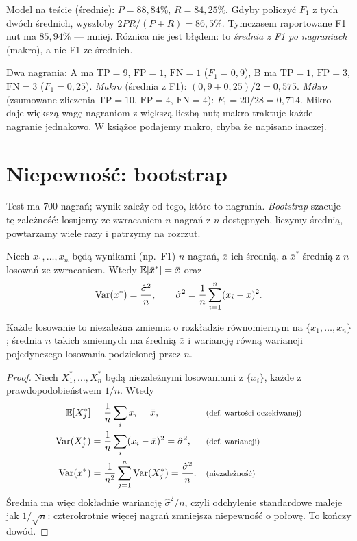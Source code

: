 \begin{naliczbach}
Model na teście (średnie): $P=88{,}84\%$, $R=84{,}25\%$. Gdyby policzyć $F_1$ z tych dwóch średnich, wyszłoby $2PR/(P+R)=86{,}5\%$. Tymczasem raportowane F1 nut ma $85{,}94\%$ --- mniej. Różnica nie jest błędem: to \emph{średnia z F1 po nagraniach} (makro), a nie F1 ze średnich.
\end{naliczbach}

\begin{przyklad}\label{prz:makro-mikro}
Dwa nagrania: A ma $\mathrm{TP}=9$, $\mathrm{FP}=1$, $\mathrm{FN}=1$ ($F_1=0{,}9$), B ma $\mathrm{TP}=1$, $\mathrm{FP}=3$, $\mathrm{FN}=3$ ($F_1=0{,}25$). \emph{Makro} (średnia z F1): $(0{,}9+0{,}25)/2=0{,}575$.
\emph{Mikro} (zsumowane zliczenia $\mathrm{TP}=10$, $\mathrm{FP}=4$, $\mathrm{FN}=4$): $F_1=20/28=0{,}714$. Mikro daje większą wagę nagraniom z większą liczbą nut; makro traktuje każde nagranie jednakowo. W książce podajemy makro, chyba że napisano inaczej.
\end{przyklad}

\section{Niepewność: bootstrap}

Test ma $700$ nagrań; wynik zależy od tego, które to nagrania. \emph{Bootstrap} szacuje tę zależność: losujemy ze zwracaniem $n$ nagrań z $n$ dostępnych, liczymy średnią, powtarzamy wiele razy i patrzymy na rozrzut.

\begin{twierdzenie}\label{tw:bootstrap}
Niech $x_1,\dots,x_n$ będą wynikami (np.\ F1) $n$ nagrań, $\bar x$ ich średnią, a $\bar x^\ast$ średnią z $n$ losowań ze zwracaniem. Wtedy $\operatorname{\mathbb{E}}[\bar x^\ast]=\bar x$ oraz
\begin{equation}
  \operatorname{Var}(\bar x^\ast)=\frac{\hat\sigma^2}{n},\qquad\hat\sigma^2=\frac1n\sum_{i=1}^n(x_i-\bar x)^2.
\end{equation}
\end{twierdzenie}
\begin{pomyslDowodu}
Każde losowanie to niezależna zmienna o rozkładzie równomiernym na $\{x_1,\dots,x_n\}$; średnia $n$ takich zmiennych ma średnią $\bar x$ i wariancję równą wariancji pojedynczego losowania podzielonej przez $n$.
\end{pomyslDowodu}
\begin{proof}
Niech $X_1^\ast,\dots,X_n^\ast$ będą niezależnymi losowaniami z $\{x_i\}$, każde z prawdopodobieństwem $1/n$. Wtedy
\begin{align*}
\Exp[X_j^\ast] &= \frac1n\sum_ix_i=\bar x, && \pow{(def.\ wartości oczekiwanej)}\\
\Var(X_j^\ast) &= \frac1n\sum_i(x_i-\bar x)^2=\hat\sigma^2, && \pow{(def.\ wariancji)}\\
\Var(\bar x^\ast) &= \frac1{n^2}\sum_{j=1}^n\Var(X_j^\ast)=\frac{\hat\sigma^2}{n}. && \pow{(niezależność)}
\end{align*}
Średnia ma więc dokładnie wariancję $\hat\sigma^2/n$, czyli odchylenie standardowe maleje jak $1/\sqrt n$: czterokrotnie więcej nagrań zmniejsza niepewność o połowę. To kończy dowód.
\end{proof}

